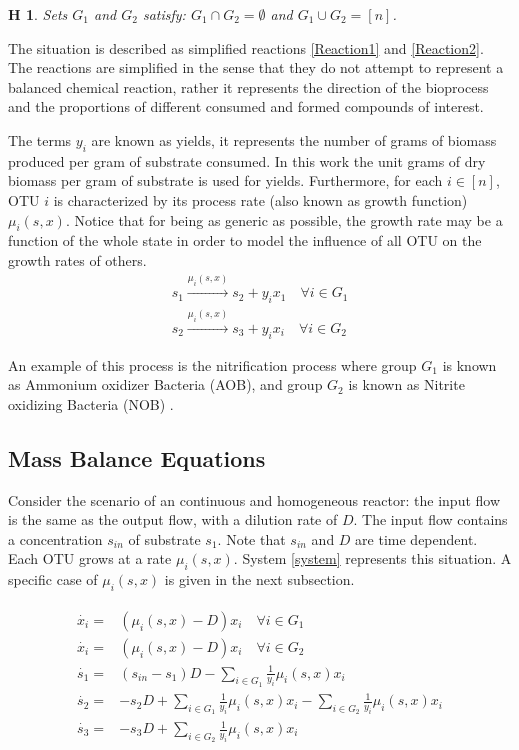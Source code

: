 \documentclass[3p,times]{elsarticle}
\newtheorem{hypo}{H}
\begin{document}
\begin{hypo}  Sets $G_1$ and $G_2$ satisfy: $G_1 \cap G_2 = \emptyset$ and $G_1 \cup G_2 = [n]$. 
\end{hypo}

The situation is described as simplified reactions \eqref{Reaction1} and \eqref{Reaction2}. The reactions are simplified in the sense that they do not attempt to represent a balanced chemical reaction, rather it represents the direction of the bioprocess and the proportions of different consumed and formed compounds of interest. 

The terms $y_i$ are known as yields, it represents the number of grams of biomass produced per gram of substrate consumed. In this work the unit grams of dry biomass per gram of substrate is used for yields. Furthermore, for each $ i \in [n]$, OTU $i$ is characterized by its process rate (also known as growth function) $\mu_i(s,x)$. Notice that for being as generic as possible, the growth rate may be a function of the whole state in order to model the influence of all OTU on the growth rates of others.
\begin{align}
\label{Reaction1} \tag{R G1} 	s_1 \stackrel{\mu_i(s,x)}{\longrightarrow} s_2 + y_ix_1 \quad \forall i \in G_1 \\
\label{Reaction2} \tag{R G2} s_2\stackrel{\mu_i(s,x)}{\longrightarrow} s_3 + y_ix_i \quad \forall i \in G_2
\end{align}

An example of this process is the nitrification process where group $G_1$ is known as Ammonium oxidizer Bacteria (AOB), and group $G_2$ is known as Nitrite oxidizing Bacteria (NOB) \cite{SHARMA1977897}.
\subsection{Mass Balance Equations}

Consider the scenario of an continuous and homogeneous reactor: the input flow is the same as the output flow, with a dilution rate of $D$. The input flow contains a concentration $s_{in}$ of substrate $s_1$. Note that $s_{in}$ and $D$ are time dependent. Each OTU grows at a rate $\mu_i(s,x)$. System \eqref{system} represents this situation. A specific case of $\mu_i(s,x)$ is given in the next subsection. 

\begin{align} 
\label{system}
\begin{array}{cl}
\dot{x_i} =& \left(\mu_i(s,x) -D \right)x_i \quad \forall i \in G_1\\
\dot{x_i} =& \left(\mu_i(s,x) -D \right)x_i \quad \forall i \in G_2 \\
\dot{s_1} =& \displaystyle (s_{in}-s_1)D-\sum\limits_{i\in G_1} \frac{1}{y_i}\mu_i(s,x) x_i  \\
\dot{s_2} = & \displaystyle -s_2D+\sum\limits_{i\in G_1}\frac{1}{y_i}\mu_i(s,x)x_i 		-\sum\limits_{i\in G_2}\frac{1}{y_i}\mu_i(s,x) x_i  \\
\dot{s_3} =&  \displaystyle -s_3D+\sum\limits_{i\in G_2}\frac{1}{y_i}\mu_i(s,x) x_i 
\end{array}
\end{align}	
\end{document}
